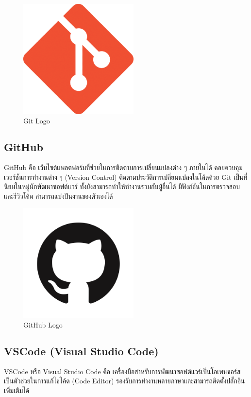 \begin{figure}[H]
    \centering
    \includegraphics[width=60mm,scale=1.0]{images/git.png}
    \caption{Git Logo}
    \label{fig:git}
\end{figure}

\subsection{GitHub}

GitHub คือ เว็บไซต์แพลตฟอร์มที่ช่วยในการติดตามการเปลี่ยนแปลงต่าง ๆ ภายในได้ คอยควบคุมเวอร์ชันการทำงานต่าง ๆ (Version Control) ติดตามประวัติการเปลี่ยนแปลงในโค้ดด้วย Git เป็นที่นิยมในหมู่นักพัฒนาซอฟต์แวร์ ทั้งยังสามารถทำให้ทำงานร่วมกับผู้อื่นได้ มีฟังก์ชันในการตรวจสอบและรีวิวโค้ด สามารถแบ่งปันงานของตัวเองได้ \cite{VCSGitHub}

\begin{figure}[H]
    \centering
    \includegraphics[width=60mm,scale=1.0]{images/github.png}
    \caption{GitHub Logo}
    \label{fig:github}
\end{figure}

\subsection{VSCode (Visual Studio Code)}

VSCode หรือ Visual Studio Code คือ เครื่องมือสำหรับการพัฒนาซอฟต์แวร์เป็นโอเพนชอร์สเป็นตัวช่วยในการแก้ไขโค้ด (Code Editor) รองรับการทำงานหลายภาษาและสามารถติดตั้งปลั๊กอินเพิ่มเติมได้ \cite{KnowVSCode}

